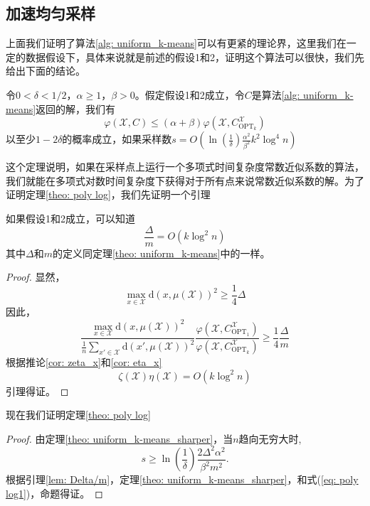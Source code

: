 \subsection{加速均匀采样}
上面我们证明了算法\ref{alg: uniform_k-means}可以有更紧的理论界，这里我们在一定的数据假设下，具体来说就是前述的假设1和2，证明这个算法可以很快，我们先给出下面的结论。
\begin{theorem}
    \label{theo: poly log}
    令$0 < \delta <1/2$，$\alpha \geq 1$，$\beta >0$。假定假设1和2成立，令$C$是算法\ref{alg: uniform_k-means}返回的解，我们有
    \begin{equation}
    \varphi(\mathcal{X},C) \leq (\alpha + \beta)\varphi(\mathcal{X},C_{\text{OPT}_k}^\mathcal{X})
    \end{equation}
    以至少$1-2\delta$的概率成立，如果采样数$s = O(\ln(\frac{1}{\delta})\frac{\alpha^2}{\beta^2}k^2\log^4 n)$
\end{theorem}
这个定理说明，如果在采样点上运行一个多项式时间复杂度常数近似系数的算法，我们就能在多项式对数时间复杂度下获得对于所有点来说常数近似系数的解。为了证明定理\ref{theo: poly log}，我们先证明一个引理
\begin{lemma}
    \label{lem: Delta/m}
    如果假设1和2成立，可以知道
    \begin{equation}
    \frac{\Delta}{m} = O(k\log^2 n)
    \end{equation}
    其中$\Delta$和$m$的定义同定理\ref{theo: uniform_k-means}中的一样。
\end{lemma}
\begin{proof}
    显然，
    \begin{equation}
    \max\limits_{x \in \mathcal{X}} \text{d}(x,\mu(\mathcal{X}))^2 \geq \frac{1}{4} \Delta
    \end{equation}
    因此，
    \begin{equation}
    \frac{\max\limits_{x \in \mathcal{X}}\text{d}(x,\mu(\mathcal{X}))^2}{\frac{1}{n}\sum_{x' \in \mathcal{X}}\text{d}(x',\mu(\mathcal{X}))^2} \frac{\varphi(\mathcal{X},C_{\text{OPT}_1}^{\mathcal{X}})}{\varphi(\mathcal{X},C_{\text{OPT}_k}^{\mathcal{X}})} \geq \frac{1}{4} \frac{\Delta}{m}
    \end{equation}
    根据推论\ref{cor: zeta_x}和\ref{cor: eta_x}
    \begin{equation}
    \zeta(\mathcal{X}) \eta(\mathcal{X}) = O(k\log^2 n) 
    \end{equation}
    引理得证。
\end{proof}
现在我们证明定理\ref{theo: poly log}
\begin{proof}
    由定理\ref{theo: uniform_k-means_sharper}，当$n$趋向无穷大时,
    \begin{equation}
    \label{eq: poly log1}
    s \geq \ln(\frac{1}{\delta})\frac{2\Delta^2 \alpha^2}{\beta^2 m^2}.
    \end{equation}
    根据引理\ref{lem: Delta/m}，定理\ref{theo: uniform_k-means_sharper}，和式(\ref{eq: poly log1})，命题得证。
\end{proof}

